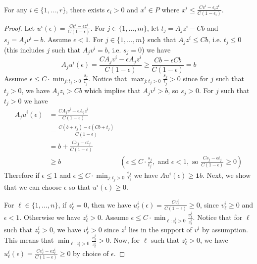 \begin{lemma}\label{epsilon}
	For any  $i\in\{1,\ldots,r\}$, there exists $\epsilon_i >0$ and ${x^i}\in P$ where ${x^i}\leq \frac{Cv^i-\epsilon_i z^i}{C(1-\epsilon_i)}$.
\end{lemma}
\begin{proof}
	
	Let $u^i(\epsilon) = \frac{Cv^i-\epsilon z^i}{C(1-\epsilon)}$. For $j\in \{1,\ldots,m\}$, let $t_j = A_jz^i-Cb$ and $s_j=A_jv^i-b$. 
	Assume $\epsilon <1$. For $j\in \{1,\ldots,m\}$ such that $A_jz^i\leq Cb$, i.e. $t_j\leq 0$ (this includes $j$ such that $A_jv^i=b$, i.e. $s_j=0$) we have
	\begin{equation*}
	A_j u^i(\epsilon) = \frac{CA_jv^i-\epsilon A_jz^i}{C(1-\epsilon)}\geq \frac{Cb-\epsilon Cb}{C(1-\epsilon)}=b
	\end{equation*}
	Assume $\epsilon \leq C\cdot\min_{j: t_j >0} \frac{s_j}{t_j}$. Notice that $\max_{j: t_j >0} \frac{s_j}{t_j}>0$ since for $j$ such that $t_j>0$, we have $A_jz_i > Cb$ which implies that $A_jv^i>b$, so $s_j>0$. For $j$ such that $t_j>0$ we have
	\begin{align*}
	A_ju^i(\epsilon) &= \frac{CA_jv^i-\epsilon A_jz^i}{C(1-\epsilon)}& \\
	&= \frac{C(b+s_j)-\epsilon (Cb+t_j)}{C(1-\epsilon)}&\\
	&= b+ \frac{Cs_j-\epsilon t_j}{C(1-\epsilon)}&\\
	&\geq b & (\epsilon  \leq C\cdot  \frac{s_j}{t_j}, \mbox{ and } \epsilon <1, \mbox{ so } \frac{Cs_j-\epsilon t_j}{C(1-\epsilon)}\geq 0 )
	\end{align*} 
	Therefore if $\epsilon \leq 1$ and $\epsilon \leq C\cdot\min_{j: t_j >0} \frac{s_j}{t_j}$ we have $Au^i(\epsilon)\geq \textbf{1}b$. Next, we show that we can choose $\epsilon$ so that $ u^i(\epsilon)\geq 0$.
	
	For $\ell\in \{1,\ldots,n\}$, if $z^i_\ell=0$, then we have $u_\ell^i(\epsilon) = \frac{Cv_\ell^i}{C(1-\epsilon)}\geq 0$, since $v^i_\ell\geq 0$ and $\epsilon <1$. Otherwise we have $z^i_\ell>0$. Assume $\epsilon \leq C\cdot \min_{ \ell:z^i_\ell>0}\frac{v^i_\ell}{z^i_\ell}$. Notice that for $\ell$ such that $z^i_\ell>0$, we have $v^i_\ell>0$ since $z^i$ lies in the support of $v^i$ by assumption. This means that $\min_{\ell:z^i_\ell>0}\frac{v^i_\ell}{z^i_\ell}>0$. Now, for $\ell$ such that $z^i_\ell>0$, we have $u^i_\ell(\epsilon) = \frac{Cv_\ell^i-\epsilon z_\ell^i}{C(1-\epsilon)}\geq 0$ by choice of $\epsilon$.
	

\end{proof}
